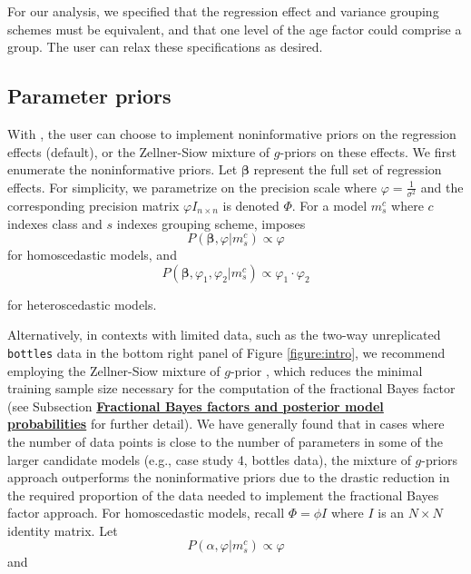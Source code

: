 For our analysis, we specified that the regression effect and variance grouping schemes must be equivalent, and that one level of the age factor could comprise a group. The user can relax these specifications as desired.  

\subsection{Parameter priors}\hypertarget{subsection:priors}{}
With , the user can choose to implement noninformative priors on the regression effects (default), or the Zellner-Siow mixture of $g$-priors on these effects. We first enumerate the noninformative priors. Let $\boldsymbol{\beta}$ represent the full set of regression effects. For simplicity, we parametrize on the precision scale where $\varphi=\frac{1}{\sigma^2}$ and the corresponding precision matrix $\varphi I_{n \times n}$ is denoted $\Phi$. For a model $m_s^c$ where $c$ indexes class and $s$ indexes grouping scheme,  imposes 
\begin{equation}\label{eqn2}
P(\boldsymbol{\beta},\varphi|m_s^c)\propto \varphi
\end{equation}
for homoscedastic models, and 
\begin{equation}\label{eqn3}
P(\boldsymbol{\beta},\varphi_1, \varphi_2|m_s^c)\propto \varphi_1\cdot \varphi_2
\end{equation}

\noindent
for heteroscedastic models. 

Alternatively, in contexts with limited data, such as the two-way unreplicated \texttt{bottles} data in the bottom right panel of Figure \ref{figure:intro}, we recommend employing the Zellner-Siow mixture of $g$-prior \citep{Zellner1980, Zellner1986, Liangetal}, which reduces the minimal training sample size necessary for the computation of the fractional Bayes factor (see Subsection \hyperlink{subsection:FBF}{\textbf{Fractional Bayes factors and posterior model probabilities}} for further detail). We have generally found that in cases where the number of data points is close to the number of parameters in some of the larger candidate models (e.g., case study 4, bottles data), the mixture of $g$-priors approach outperforms the noninformative priors due to the drastic reduction in the required proportion of the data needed to implement the fractional Bayes factor approach. For homoscedastic models, recall $\Phi=\phi I$ where $I$ is an $N\times N$ identity matrix. Let 
\begin{equation}\label{eqn4}
P(\alpha,\varphi|m_s^c)\propto\varphi
\end{equation}
and 

